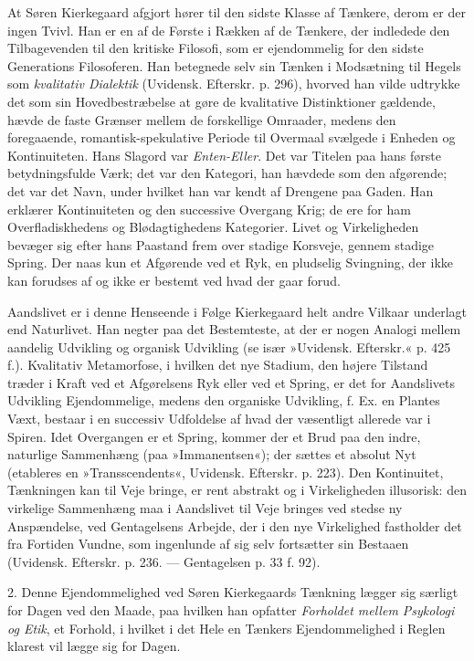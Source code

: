 \documentclass[12pt,a4paper,openany]{book}
\newcommand{\opage}[1]{\marginnote{\footnotesize\textit{[#1]}}}
\begin{document}
At Søren Kierkegaard afgjort hører til den sidste
Klasse af Tænkere, derom er der ingen Tvivl. Han er
en af de Første i Rækken af de Tænkere, der indledede
den Tilbagevenden til den kritiske Filosofi, som er ejendommelig
for den sidste Generations Filosoferen. Han
betegnede selv sin Tænken i Modsætning til Hegels som
\textit{kvalitativ Dialektik} (Uvidensk. Efterskr. p. 296), hvorved
han vilde udtrykke det som sin Hovedbestræbelse at
gøre de kvalitative Distinktioner gældende, hævde de
faste Grænser mellem de forskellige Omraader, medens
den foregaaende, romantisk-spekulative Periode til Overmaal
svælgede i Enheden og Kontinuiteten. Hans Slagord
var \textit{Enten-Eller}. Det var Titelen paa hans første betydningsfulde
Værk; det var den Kategori, han hævdede
som den afgørende; det var det Navn, under hvilket han
var kendt af Drengene paa Gaden. Han erklærer Kontinuiteten
og den successive Overgang Krig; de ere for
ham Overfladiskhedens og Blødagtighedens Kategorier.
Livet og Virkeligheden bevæger sig efter hans Paastand
frem over stadige Korsveje, gennem stadige Spring. Der
naas kun et Afgørende ved et Ryk, en pludselig Svingning,
der ikke kan forudses af og ikke er bestemt ved
hvad der gaar forud.

Aandslivet er i denne Henseende i Følge Kierkegaard
helt andre Vilkaar underlagt end Naturlivet. Han
negter paa det Bestemteste, at der er nogen Analogi
mellem aandelig Udvikling og organisk Udvikling (se
især »Uvidensk. Efterskr.« p. 425 f.). Kvalitativ Metamorfose,
i hvilken det nye Stadium, den højere Tilstand
træder i Kraft ved et Afgørelsens Ryk eller ved et
Spring, er det for Aandslivets Udvikling Ejendommelige,
medens den organiske Udvikling, f. Ex. en Plantes Væxt,
\opage{73}bestaar i en successiv Udfoldelse af hvad der væsentligt
allerede var i Spiren. Idet Overgangen er et Spring,
kommer der et Brud paa den indre, naturlige Sammenhæng
(paa »Immanentsen«); der sættes et absolut Nyt
(etableres en »Transscendents«, Uvidensk. Efterskr. p.
223). Den Kontinuitet, Tænkningen kan til Veje bringe,
er rent abstrakt og i Virkeligheden illusorisk: den virkelige
Sammenhæng maa i Aandslivet til Veje bringes ved
stedse ny Anspændelse, ved Gentagelsens Arbejde, der i
den nye Virkelighed fastholder det fra Fortiden Vundne,
som ingenlunde af sig selv fortsætter sin Bestaaen
(Uvidensk. Efterskr. p. 236. --- Gentagelsen p. 33 f. 92).

2. Denne Ejendommelighed ved Søren Kierkegaards
Tænkning lægger sig særligt for Dagen ved den Maade,
paa hvilken han opfatter \textit{Forholdet mellem Psykologi og
Etik}, et Forhold, i hvilket i det Hele en Tænkers Ejendommelighed
i Reglen klarest vil lægge sig for Dagen.
\end{document}
